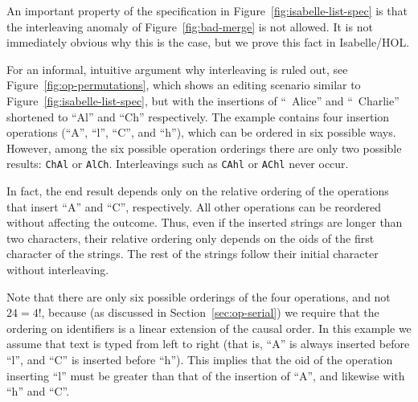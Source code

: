 An important property of the specification in Figure~\ref{fig:isabelle-list-spec} is that the interleaving anomaly of Figure~\ref{fig:bad-merge} is not allowed.
It is not immediately obvious why this is the case, but we prove this fact in Isabelle/HOL.

For an informal, intuitive argument why interleaving is ruled out, see Figure~\ref{fig:op-permutations}, which shows an editing scenario similar to Figure~\ref{fig:isabelle-list-spec}, but with the insertions of ``~Alice'' and ``~Charlie'' shortened to ``Al'' and ``Ch'' respectively.
The example contains four insertion operations (``A'', ``l'', ``C'', and ``h''), which can be ordered in six possible ways.
However, among the six possible operation orderings there are only two possible results: \texttt{ChAl} or \texttt{AlCh}.
Interleavings such as \texttt{CAhl} or \texttt{AChl} never occur.

In fact, the end result depends only on the relative ordering of the operations that insert ``A'' and ``C'', respectively.
All other operations can be reordered without affecting the outcome.
Thus, even if the inserted strings are longer than two characters, their relative ordering only depends on the oids of the first character of the strings.
The rest of the strings follow their initial character without interleaving.

Note that there are only six possible orderings of the four operations, and not $24 = 4!$, because (as discussed in Section~\ref{sec:op-serial}) we require that the ordering on identifiers is a linear extension of the causal order.
In this example we assume that text is typed from left to right (that is, ``A'' is always inserted before ``l'', and ``C'' is inserted before ``h'').
This implies that the oid of the operation inserting ``l'' must be greater than that of the insertion of ``A'', and likewise with ``h'' and ``C''.

